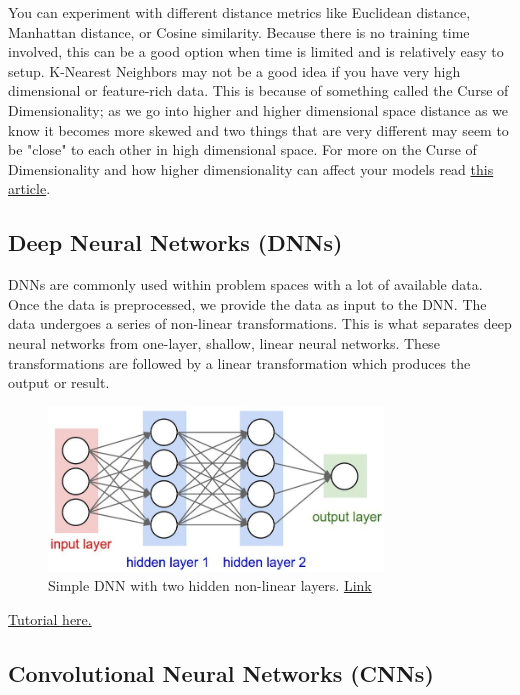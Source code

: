 \documentclass{article}
\begin{document}
You can experiment with different distance metrics like Euclidean distance, Manhattan distance, or Cosine similarity. Because there is no training time involved, this can be a good option when time is limited and is relatively easy to setup. K-Nearest Neighbors may not be a good idea if you have very high dimensional or feature-rich data. This is because of something called the Curse of Dimensionality; as we go into higher and higher dimensional space distance as we know it becomes more skewed and two things that are very different may seem to be "close" to each other in high dimensional space. For more on the Curse of Dimensionality and how higher dimensionality can affect your models read \href{https://towardsdatascience.com/curse-of-dimensionality-2092410f3d27}{this article}.

\newpage
\subsection{Deep Neural Networks (DNNs)} 
DNNs are commonly used within problem spaces with a lot of available data. Once the data is preprocessed, we provide the data as input to the DNN. The data undergoes a series of non-linear transformations. This is what separates deep neural networks from one-layer, shallow, linear neural networks. These transformations are followed by a linear transformation which produces the output or result. 
\begin{figure}[H]
    \centering
    \includegraphics[width=3.5in]{nn.jpg}
    \caption{Simple DNN with two hidden non-linear layers. \href{https://www.digitaltrends.com/cool-tech/what-is-an-artificial-neural-network/}{Link}}
\end{figure}

\href{https://playground.tensorflow.org}{Tutorial here.}

\newpage
\subsection{Convolutional Neural Networks (CNNs)} 
\end{document}
